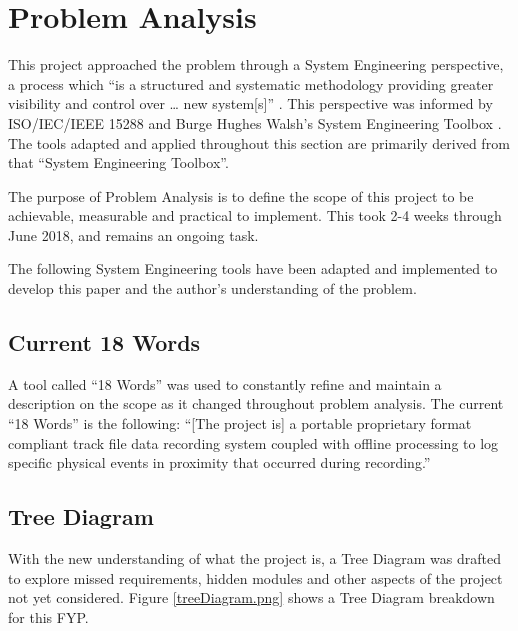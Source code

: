 \documentclass{UoNMCHA}
\newcommand{\inlineQuote}[1]{``#1''}
\newcommand{\fref}[1] {Figure \ref{#1}}
\numberwithin{equation}{section}
\begin{document}
\section{Problem Analysis}\label{sec:ProblemAnalysis}

This project approached the problem through a System Engineering perspective, a process which “is a structured and systematic methodology providing greater visibility and control over … new system[s]” \cite{limited2018systems}. This perspective was informed by ISO/IEC/IEEE 15288 \cite{IEEE15288} and Burge Hughes Walsh’s System Engineering Toolbox \cite{SysThink2015}. The tools adapted and applied throughout this section are primarily derived from that \inlineQuote{System Engineering Toolbox}. 

The purpose of Problem Analysis is to define the scope of this project to be achievable, measurable and practical to implement. This took 2-4 weeks through June 2018, and remains an ongoing task. 

The following System Engineering tools have been adapted and implemented to develop this paper and the author’s understanding of the problem. 

\subsection{Current 18 Words}
A tool called \inlineQuote{18 Words} was used to constantly refine and maintain a description on the scope as it changed throughout problem analysis. The current “18 Words” is the following:
“[The project is] a portable proprietary format compliant track file data recording system coupled with offline processing to log specific physical events in proximity that occurred during recording.” 

\subsection{Tree Diagram}
With the new understanding of what the project is, a Tree Diagram was drafted to explore missed requirements, hidden modules and other aspects of the project not yet considered. \fref{treeDiagram.png} shows a Tree Diagram breakdown for this FYP.
\end{document}
